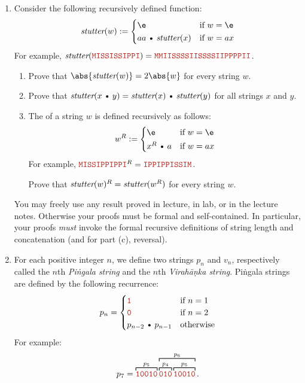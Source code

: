 \documentclass[11pt]{article}
\def\Cdot{\mathbin{\text{\normalfont \textbullet}}}
\def\Sym#1{\texttt{\color{BrickRed}#1}}
\begin{document}
\newpage


\begin{enumerate}

\item
Consider the following recursively defined function:
\[
	\emph{stutter}(w) := \begin{cases}
		\e & \text{if $w=\e$}\\[0.25ex]
		aa\Cdot \emph{stutter}(x) & \text{if $w = ax$}
	\end{cases}
\]
For example, $\emph{stutter}(\Sym{MISSISSIPPI}) = \Sym{MMIISSSSIISSSSIIPPPPII}$.
\begin{enumerate}
\item
Prove that $\abs{\emph{stutter}(w)} = 2\abs{w}$ for every string $w$.

\item
Prove that $\emph{stutter}(x\Cdot y) = \emph{stutter}(x)\Cdot \emph{stutter}(y)$ for all strings $x$ and $y$.

\item
\textcolor{PineGreen}{}

The  of a string $w$ is defined recursively as follows:
\[	
	w^R := \begin{cases}
		\e & \text{if $w=\e$} \\[0.5ex]
		x^R \Cdot a & \text{if $w=ax$}
	\end{cases}
\]
For example, $\Sym{MISSIPPIPPI}^R = \Sym{IPPIPPISSIM}$.

Prove that $\emph{stutter}(w)^R = \emph{stutter}(w^R)$ for every string $w$.

\end{enumerate}

You may freely use any result proved in lecture, in lab, or in the lecture notes.  Otherwise your proofs must be formal and self-contained.  In particular, your proofs \emph{must} invoke the formal recursive definitions of string length and concatenation \textcolor{PineGreen}{(and for part (c), reversal)}.

\newpage
\item
For each positive integer $n$, we define two strings $p_n$ and $v_n$, respectively called the $n$th \emph{Piṅgala string} and the $n$th \emph{Virahāṇka string}.  Piṅgala strings are defined by the following recurrence:
\[
	p_n = \begin{cases}
		\Sym1 & \text{if $n=1$} \\
		\Sym0 & \text{if $n=2$} \\
		p_{n-2}\Cdot p_{n-1} & \text{otherwise}
	\end{cases}
\]
For example:
\[
	p_7
	= \overbracket[0.75pt]{\Sym{10010}}^{p_5}
		\overbracket[0.75pt]{
			\overbracket[0.75pt]{\Sym{010}}^{p_4}
			\overbracket[0.75pt]{\Sym{10010}}^{p_5}
		}^{p_6}.
\]


\end{enumerate}
\end{document}
